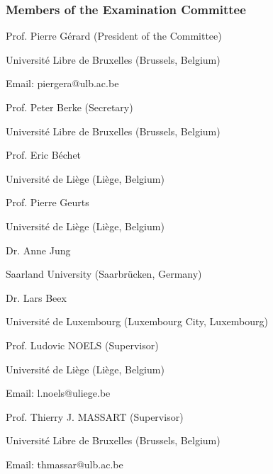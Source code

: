 \begin{flushright}
\begin{minipage}{0.9\textwidth}

\subsubsection*{Members of the Examination Committee}
{
\vspace{3mm}

Prof. Pierre G\'erard (President of the Committee)

Universit\'e Libre de Bruxelles (Brussels, Belgium)

Email: piergera@ulb.ac.be

\vspace{3mm}

Prof. Peter Berke (Secretary)

Universit\'e Libre de Bruxelles (Brussels, Belgium)

\vspace{10mm}

Prof. Eric B\'echet

Universit\'e de Li\`ege (Li\`ege, Belgium)

\vspace{3mm}

Prof. Pierre Geurts

Universit\'e de Li\`ege (Li\`ege, Belgium)

\vspace{3mm}

Dr. Anne Jung

Saarland University (Saarbr\"ucken, Germany)

\vspace{3mm}

Dr. Lars Beex

Universit\'e de Luxembourg (Luxembourg City, Luxembourg)

\vspace{10mm}

Prof. Ludovic NOELS (Supervisor)

Universit\'e de Li\`ege (Li\`ege, Belgium)

Email: l.noels@uliege.be

\vspace{3mm}

Prof. Thierry J. MASSART (Supervisor)

Universit\'e Libre de Bruxelles (Brussels, Belgium)

Email: thmassar@ulb.ac.be

\par
}
\end{minipage}
\end{flushright}
